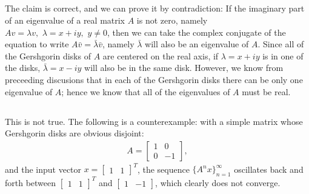 \documentclass[11pt]{article}
\begin{document}
\subsection{}
The claim is correct, and we can prove it by contradiction: If the imaginary part of an eigenvalue of a real matrix $A$ is not zero, namely $Av=\lambda v,\,\,\lambda =x+iy,\,\,y\neq0$, then we can take the complex conjugate of the equation to write $A\bar v = \bar\lambda\bar v$, namely $\bar\lambda$ will also be an eigenvalue of $A$. Since all of the Gershgorin disks of $A$ are centered on the real axis, if $\lambda=x+iy$ is in one of the disks, $\bar\lambda=x-iy$ will also be in the same disk. However, we know from preceeding discusions that in each of the Gershgorin disks there can be only one eigenvalue of $A$; hence we know that all of the eigenvalues of $A$ must be real.

\subsection{}
This is not true. The following is a counterexample: with a simple matrix whose Gershgorin disks are obvious disjoint:
\begin{equation}\begin{split} 
A = \begin{bmatrix}1&0\\0&-1 \end{bmatrix}, 
\end{split}\nonumber\end{equation}
and the input vector $x = \begin{bmatrix} 1&1\end{bmatrix}^T $, the sequence $\{A^nx\}_{n=1}^{\infty}$ oscillates back and forth between $\begin{bmatrix} 1&1\end{bmatrix}^T $ and $\begin{bmatrix} 1 & -1\end{bmatrix} $, which clearly does not converge.
\end{document}
